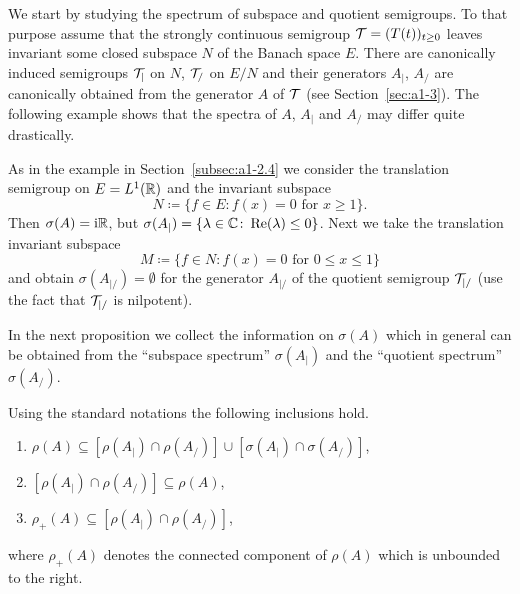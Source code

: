 We start by studying the spectrum of subspace and quotient semigroups.
To that purpose assume that the strongly continuous semigroup $\TT = (T(t))_{t \geq 0}$ leaves invariant some closed subspace $N$ of the Banach space $E$.
There are canonically induced semigroups $\mathcal{T}_{|}$ on $N$, \resp $\mathcal{T}_{/}$ on $E/N$ and their generators $A_{|}$, \resp $A_{/}$ are canonically obtained from the generator $A$ of\/ $\mathcal{T}$ (see Section~\ref{sec:a1-3}).
The following example shows that the spectra of\/ $A$, $A_{|}$ and $A_{/}$ may differ quite drastically.
\begin{example}\label{ex:a3-4.1}
As in the example in Section~\ref{subsec:a1-2.4} we consider the translation semigroup on $E = L^{1}(\mathbb{R})$ and the 
invariant subspace 
%
\[
	N \coloneq \{f \in E \colon f(x) = 0 \text{ for } x \geq 1\} .
\]
%
Then $\sigma(A) = \mathrm{i}\mathbb{R}$, but $\sigma(A_{|}) = \{\lambda \in \C \colon \Re(\lambda) \leq 0\}$.
Next we take the translation invariant subspace 
%
\[
	M \coloneq \{f \in N \colon f(x) = 0 \text{ for } 0 \leq x \leq 1\}
\]
%
and obtain $\sigma(A_{|/}) = \emptyset$ for the generator $A_{|/}$ of the quotient semigroup $\mathcal{T}_{|/}$ (use the fact that $\mathcal{T}_{|/}$ is nilpotent).
\end{example}
In the next proposition we collect the information on $\sigma(A)$ which in general can be obtained from the \enquote{subspace spectrum} $\sigma(A_{|})$ and the \enquote{quotient spectrum} $\sigma(A_{/})$.
\begin{proposition}\label{prop:a3-4.2}
Using the standard notations the following inclusions hold.
\begin{enumerate}[\upshape (i)]
\item 
$\rho(A) \subseteq [\rho(A_{|}) \cap \rho(A_{/})] \cup [\sigma(A_{|}) \cap \sigma(A_{/})]$,

\item 
$[\rho(A_{|}) \cap \rho(A_{/})] \subseteq \rho(A) $,

\item 
$\rho_{+}(A) \subseteq [\rho(A_{|}) \cap \rho(A_{/})]$,
\end{enumerate}
 where $\rho_{+}(A)$ denotes the connected component of\/ $\rho(A)$ which is unbounded to the right.

\end{proposition}
